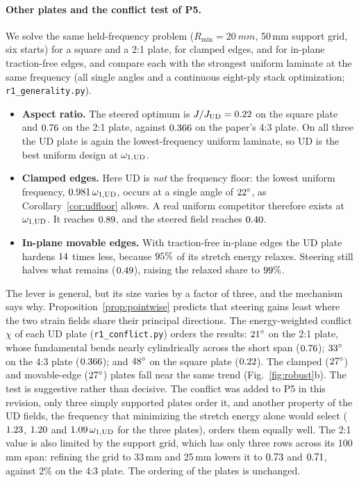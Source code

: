 \paragraph{Other plates and the conflict test of P5.} We solve the same held-frequency problem
($R_{\min}=\SI{20}{mm}$, 50\,mm support grid, six starts) for a square and a 2:1 plate, for clamped
edges, and for in-plane traction-free edges, and compare each with the strongest uniform laminate at
the same frequency (all single angles and a continuous eight-ply stack optimization;
\texttt{r1\_\allowbreak generality.py}).
\begin{itemize}[itemsep=1pt]
\item \textbf{Aspect ratio.} The steered optimum is $J/J_{\mathrm{UD}}=0.22$ on the square plate and
  $0.76$ on the 2:1 plate, against $0.366$ on the paper's 4:3 plate. On all three the UD
  plate is again the lowest-frequency uniform laminate, so UD is the best uniform design at
  $\omega_{1,\mathrm{UD}}$.
\item \textbf{Clamped edges.} Here UD is \emph{not} the frequency floor: the lowest uniform frequency,
  $0.981\,\omega_{1,\mathrm{UD}}$, occurs at a single angle of $22^\circ$, as
  Corollary~\ref{cor:udfloor} allows. A real uniform competitor therefore exists at $\omega_{1,\mathrm{UD}}$. It
  reaches $0.89$, and the steered field reaches $0.40$.
\item \textbf{In-plane movable edges.} With traction-free in-plane edges the UD plate hardens
  $14$ times less, because $95\%$ of its stretch energy relaxes. Steering still
  halves what remains ($0.49$), raising the relaxed share to $99\%$.
\end{itemize}
The lever is general, but its size varies by a factor of three, and the mechanism says why.
Proposition~\ref{prop:pointwise} predicts that steering gains least where the two strain fields share
their principal directions. The energy-weighted conflict $\chi$ of each UD plate
(\texttt{r1\_\allowbreak conflict.py}) orders the results: $21^\circ$ on the 2:1 plate, whose
fundamental bends nearly cylindrically across the short span ($0.76$); $33^\circ$ on the
4:3 plate ($0.366$); and $48^\circ$ on the square plate ($0.22$). The clamped
($27^\circ$) and movable-edge ($27^\circ$) plates fall near the same trend
(Fig.~\ref{fig:robust}b). The test is suggestive rather than decisive. The conflict was added to P5
in this revision, only three simply supported plates order it, and another property of the UD fields,
the frequency that minimizing the stretch energy alone would select ($1.23$, $1.20$ and
$1.09\,\omega_{1,\mathrm{UD}}$ for the three plates), orders them equally well. The 2:1 value is also
limited by the support grid, which has only three rows across its 100\,mm span: refining the grid to
33\,mm and 25\,mm lowers it to $0.73$ and $0.71$, against $2\%$ on the 4:3 plate. The ordering
of the plates is unchanged.

